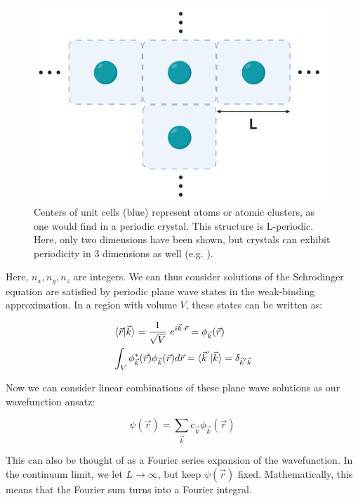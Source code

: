 \documentclass[]{article}
\begin{document}
\begin{figure}[hbt]
	\centering
	\includegraphics[scale = 0.55]{PBC.PNG}
	\caption{Centers of unit cells (blue) represent atoms or atomic clusters, as one would find in a periodic crystal. This structure is L-periodic. Here, only two dimensions have been shown, but crystals can exhibit periodicity in 3 dimensions as well (e.g. ). }
	\label{fig: Periodic Boundary Conditions}
\end{figure}

Here, $n_x, n_y, n_z$ are integers. We can thus consider solutions of the Schrodinger equation are satisfied by periodic plane wave states in the weak-binding approximation. In a region with volume $V$, these states can be written as:

\begin{align}
&\braket{\vec{r} | \vec{k}} = \frac{1}{\sqrt{V}}  \ e^{i\vec{k}\cdot\vec{r}} = \phi_{\vec{k}}(\vec{r})\\
&\int_V \phi_{\vec{k}}^{*}(\vec{r})\phi_{\vec{k}}(\vec{r})d\vec{r} = \braket{\vec{k}^{'} | \vec{k}} = \delta_{\vec{k}^{'} \vec{k}}
\end{align}  

Now we can consider linear combinations of these plane wave solutions as our wavefunction ansatz:

\begin{equation}
	\psi(\vec{r}) = \sum_{\vec{k}}c_{\vec{k}}\phi_{\vec{k}}(\vec{r})
\end{equation}

This can also be thought of as a Fourier series expansion of the wavefunction. In the continuum limit, we let $L \to \infty$, but keep $\psi(\vec{r})$ fixed. Mathematically, this means that the Fourier sum turns into a Fourier integral. 
\newline
\end{document}
